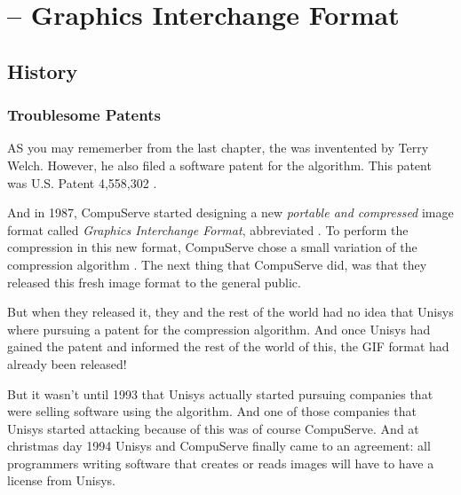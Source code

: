 \begin{comment}
  
\end{comment}

\chapter{\gif -- Graphics Interchange Format}
\label{cha:gif}

\begin{refsection}

  \section{History}


  \subsection{Troublesome Patents}

  AS you may rememerber from the last chapter, the \lzw was
  inventented by Terry Welch. However, he also filed a software patent
  for the algorithm. This patent was U.S. Patent 4,558,302
  \cite{welch85:_u,roelofs09:_histor_portab_networ_graph_png_format}.

  \newcommand{\compus}{CompuServe\xspace}

  And in 1987, \compus started designing a new \textit{portable and
    compressed} image format called \textit{Graphics Interchange
    Format}, abbreviated \gif. To perform the compression in this new
  format, \compus chose a small variation of the compression algorithm
  \lzw. The next thing that \compus did, was that they released this fresh
  image format to the general public.

  But when they released it, they and the rest of the world had no idea
  that Unisys where pursuing a patent for the \lzw compression
  algorithm. And once Unisys had gained the patent and informed the rest
  of the world of this, the GIF format had already been released!

  But it wasn't until 1993 that Unisys actually started pursuing
  companies that were selling software using the \lzw algorithm. And one
  of those companies that Unisys started attacking because of this was
  of course \compus. And at christmas day 1994 Unisys and \compus
  finally came to an agreement: all programmers writing software that
  creates or reads images will have to have a license from Unisys.


\end{refsection}
